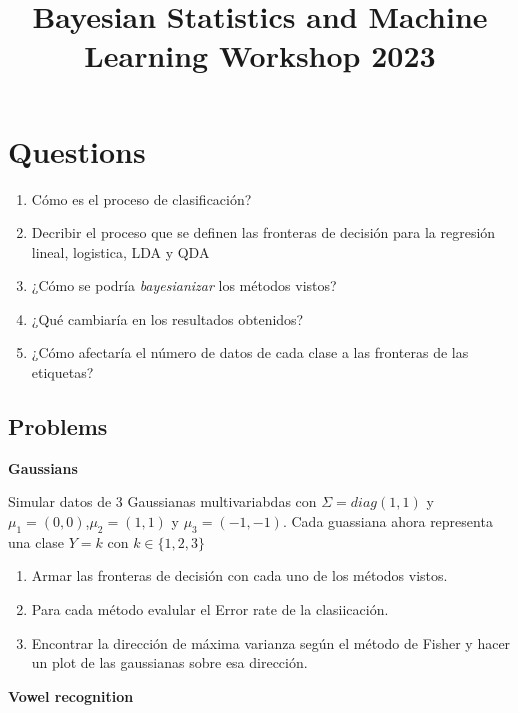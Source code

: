 \documentclass[12pt]{paper}
\title{\begin{center}Bayesian Statistics and Machine Learning Workshop 2023\end{center}}
\subtitle{\begin{center}\Large Introuction to Classification Methods\\ Martín Onetto \end{center}}
\begin{document}
\maketitle


\topmargin -2.0cm
\oddsidemargin -0.2cm
\evensidemargin -0.2cm

\vspace{-80pt}

\section{Questions}

\begin{enumerate}
\item Cómo es el proceso de clasificación?
\item Decribir el proceso que se definen las fronteras de decisión para la regresión lineal, logistica, LDA y QDA
\item ¿Cómo se podría \textit{bayesianizar} los métodos vistos?
\item ¿Qué cambiaría en los resultados obtenidos?
\item ¿Cómo afectaría el número de datos de cada clase a las fronteras de las etiquetas?
\end{enumerate}

\subsection{Problems}

\textbf{Gaussians}

Simular datos de 3 Gaussianas multivariabdas con $\Sigma = diag(1,1)$ y $\mu_{1} = (0,0)$,$\mu_{2} =(1,1)$ y $\mu_{3} = (-1,-1)$. Cada guassiana ahora representa una clase $Y = k$ con $k \in \{1,2,3\}$
\begin{enumerate}
\item Armar las fronteras de decisión con cada uno de los métodos vistos.
\item Para cada método evalular el Error rate de la clasiicación. 
\item Encontrar la dirección de máxima varianza según el método de Fisher y hacer un plot de las gaussianas sobre esa dirección.
\end{enumerate}
\newpage

\textbf{Vowel recognition}
\end{document}
